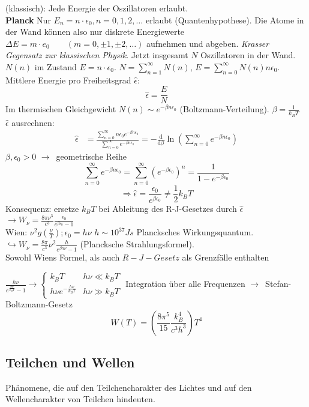 \documentclass[oneside]{book}
\theoremstyle{definition}
\newcommand{\conseq}{$\rightarrow$~}
\renewcommand{\d}{\mathrm d}
\newcommand{\dd}[1]{\frac{\d}{\d #1}}
\begin{document}
(klassisch): Jede Energie der Oszillatoren erlaubt.\\
\textbf{Planck} Nur $E_n = n \cdot \epsilon_0, n = 0, 1, 2, \dots$ erlaubt (Quantenhypothese). Die Atome in der Wand können also nur diskrete Energiewerte $\Delta E = m \cdot e_0 \qquad (m = 0, \pm 1, \pm 2, \dots)$ aufnehmen und abgeben. \emph{Krasser Gegensatz zur klassischen Physik}. Jetzt insgesamt $N$ Oszillatoren in der Wand. $N(n)$ im Zustand $E = n \cdot \epsilon_0$. $N = \sum_{n=1}^{\infty} N(n)$, $E = \sum_{n=0}^{\infty} N(n) n \epsilon_0$.\\
Mittlere Energie pro Freiheitsgrad $\hat \epsilon$:
$$\hat \epsilon = \frac{E}{N}$$
Im thermischen Gleichgewicht $N(n) \sim e^{- \beta n \epsilon_0}$ (Boltzmann-Verteilung). $\beta = \frac{1}{k_B T}$\\
$\hat \epsilon$ ausrechnen:
\begin{align*}
		\hat \epsilon &= \frac{\sum_{n=0}^\infty n \epsilon_0 e^{- \beta n \epsilon_0}}{\sum_{n=0}^\infty e^{- \beta n \epsilon_0}}  = - \dd \beta \ln (\sum_{n=0}^\infty e^{- \beta n \epsilon_0})
\end{align*}
$\beta, \epsilon_0 > 0 $ \conseq geometrische Reihe
$$\sum_{n=0}^\infty e^{- \beta n \epsilon_0} = \sum_{n=0}^\infty (e^{- \beta \epsilon_0})^n = \frac{1}{1 - e^{-\beta \epsilon_0}}$$
$$\Rightarrow \hat \epsilon = \frac{\epsilon_0}{e^{\beta \epsilon_0}} \neq \frac12 k_B T$$
Konsequenz: ersetze $k_B T$ bei Ableitung des R-J-Gesetzes durch $\hat \epsilon$\\
$\rightarrow W_\nu = \frac{8\pi\nu^3}{c^3} \frac{\epsilon_0}{e^{\beta \epsilon_0} - 1}$\\
Wien: $\nu^2 g(\frac{\nu}{T}); \epsilon_0 = h \nu$ $h \sim 10^{37} Js$ Plancksches Wirkungsquantum.\\
$\hookrightarrow W_\nu = \frac{8\pi}{c^3} \nu^2 \frac{h}{e^{\beta h \nu} - 1}$ (Plancksche Strahlungsformel).\\
Sowohl Wiens Formel, als auch $R-J-Gesetz$ als Grenzfälle enthalten

$\frac{h \nu}{e^{\frac{h\nu}{k_B T}} - 1} \rightarrow \begin{cases}
k_B T & h\nu \ll k_B T\\
h \nu e^{- \frac{h\nu}{k_B T}} & h \nu \gg k_B T
\end{cases}$
Integration über alle Frequenzen \conseq Stefan-Boltzmann-Gesetz
$$W(T) = (\frac{8\pi^5}{15} \frac{k_B^4}{c^3 h^3}) T^4$$

\subsection{Teilchen und Wellen}
Phänomene, die auf den Teilchencharakter des Lichtes und auf den Wellencharakter von Teilchen hindeuten.
\end{document}
